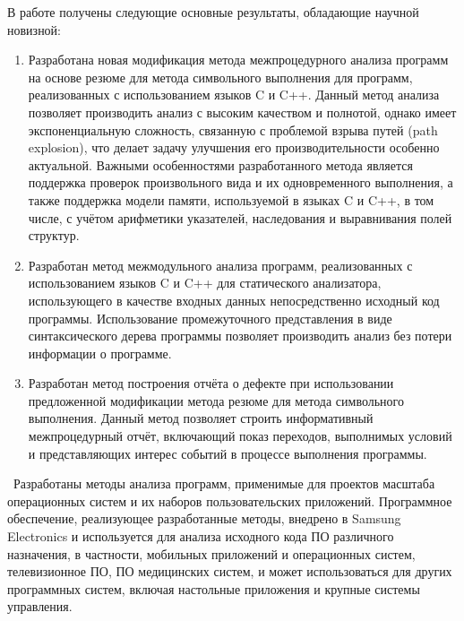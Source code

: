 В работе получены следующие основные результаты, обладающие научной новизной:
\begin{enumerate}
  \item Разработана новая модификация метода межпроцедурного анализа программ на основе резюме для метода символьного выполнения для программ, реализованных с использованием языков C и C++. Данный метод анализа позволяет производить анализ с высоким качеством и полнотой, однако имеет экспоненциальную сложность, связанную с проблемой взрыва путей (path explosion), что делает задачу улучшения его производительности особенно актуальной. Важными особенностями разработанного метода является поддержка проверок произвольного вида и их одновременного выполнения, а также поддержка модели памяти, используемой в языках C и C++, в том числе, с учётом арифметики указателей, наследования и выравнивания полей структур.
  \item Разработан метод межмодульного анализа программ, реализованных с использованием языков C и C++ для статического анализатора, использующего в качестве входных данных непосредственно исходный код программы. Использование промежуточного представления в виде синтаксического дерева программы позволяет производить анализ без потери информации о программе.
  \item Разработан метод построения отчёта о дефекте при использовании предложенной модификации метода резюме для метода символьного выполнения. Данный метод позволяет строить информативный межпроцедурный отчёт, включающий показ переходов, выполнимых условий и представляющих интерес событий в процессе выполнения программы.
\end{enumerate}

\influence\ Разработаны методы анализа программ, применимые для проектов масштаба операционных систем и их наборов пользовательских приложений. Программное обеспечение, реализующее разработанные методы, внедрено в Samsung Electronics и используется для анализа исходного кода ПО различного назначения, в частности, мобильных приложений и операционных систем, телевизионное ПО, ПО медицинских систем, и может использоваться для других программных систем, включая настольные приложения и крупные системы управления. 


